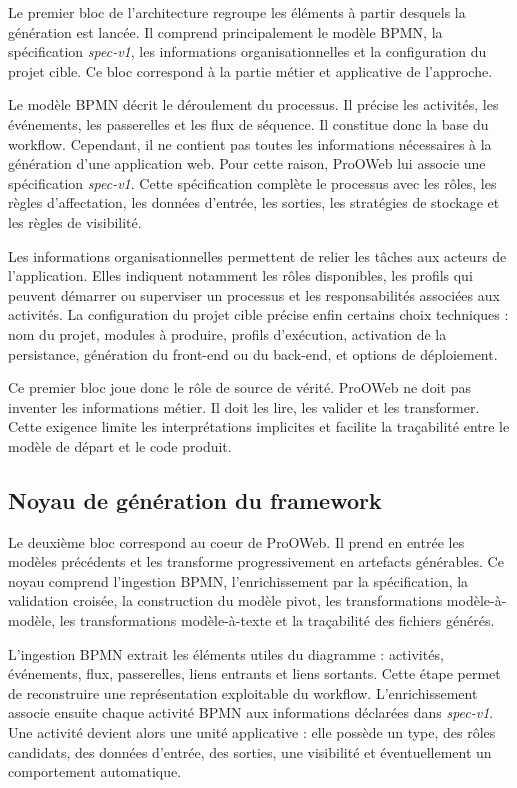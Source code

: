 Le premier bloc de l'architecture regroupe les éléments à partir desquels la génération est lancée. Il comprend principalement le modèle BPMN, la spécification \textit{spec-v1}, les informations organisationnelles et la configuration du projet cible. Ce bloc correspond à la partie métier et applicative de l'approche.

Le modèle BPMN décrit le déroulement du processus. Il précise les activités, les événements, les passerelles et les flux de séquence. Il constitue donc la base du workflow. Cependant, il ne contient pas toutes les informations nécessaires à la génération d'une application web. Pour cette raison, ProOWeb lui associe une spécification \textit{spec-v1}. Cette spécification complète le processus avec les rôles, les règles d'affectation, les données d'entrée, les sorties, les stratégies de stockage et les règles de visibilité.

Les informations organisationnelles permettent de relier les tâches aux acteurs de l'application. Elles indiquent notamment les rôles disponibles, les profils qui peuvent démarrer ou superviser un processus et les responsabilités associées aux activités. La configuration du projet cible précise enfin certains choix techniques : nom du projet, modules à produire, profils d'exécution, activation de la persistance, génération du front-end ou du back-end, et options de déploiement.

Ce premier bloc joue donc le rôle de source de vérité. ProOWeb ne doit pas inventer les informations métier. Il doit les lire, les valider et les transformer. Cette exigence limite les interprétations implicites et facilite la traçabilité entre le modèle de départ et le code produit.

\subsection{Noyau de génération du framework}

Le deuxième bloc correspond au coeur de ProOWeb. Il prend en entrée les modèles précédents et les transforme progressivement en artefacts générables. Ce noyau comprend l'ingestion BPMN, l'enrichissement par la spécification, la validation croisée, la construction du modèle pivot, les transformations modèle-à-modèle, les transformations modèle-à-texte et la traçabilité des fichiers générés.

L'ingestion BPMN extrait les éléments utiles du diagramme : activités, événements, flux, passerelles, liens entrants et liens sortants. Cette étape permet de reconstruire une représentation exploitable du workflow. L'enrichissement associe ensuite chaque activité BPMN aux informations déclarées dans \textit{spec-v1}. Une activité devient alors une unité applicative : elle possède un type, des rôles candidats, des données d'entrée, des sorties, une visibilité et éventuellement un comportement automatique.

